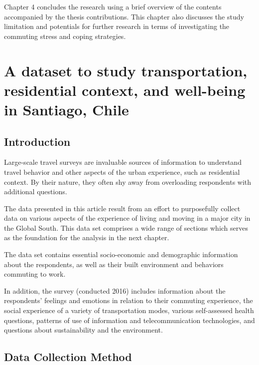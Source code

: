 \documentclass[
11pt, %
oneside, %
english, %
singlespacing, %
]{macthesis} %
\begin{document}
Chapter 4 concludes the research using a brief overview of the contents accompanied by the thesis contributions. This chapter also discusses the study limitation and potentials for further research in terms of investigating the commuting stress and coping strategies.

\hypertarget{a-dataset-to-study-transportation-residential-context-and-well-being-in-santiago-chile}{%
\chapter{A dataset to study transportation, residential context, and well-being in Santiago, Chile}\label{a-dataset-to-study-transportation-residential-context-and-well-being-in-santiago-chile}}

\hypertarget{introduction-2}{%
\section{Introduction}\label{introduction-2}}

Large-scale travel surveys are invaluable sources of information to understand travel behavior and other aspects of the urban experience, such as residential context. By their nature, they often shy away from overloading respondents with additional questions.

The data presented in this article result from an effort to purposefully collect data on various aspects of the experience of living and moving in a major city in the Global South. This data set comprises a wide range of sections which serves as the foundation for the analysis in the next chapter.

The data set contains essential socio-economic and demographic information about the respondents, as well as their built environment and behaviors commuting to work.

In addition, the survey (conducted 2016) includes information about the respondents' feelings and emotions in relation to their commuting experience, the social experience of a variety of transportation modes, various self-assessed health questions, patterns of use of information and telecommunication technologies, and questions about sustainability and the environment.

\hypertarget{data-collection-method}{%
\section{Data Collection Method}\label{data-collection-method}}
\end{document}
